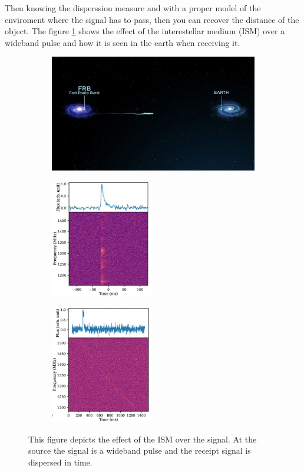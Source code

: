 Then knowing the disperssion measure and with a proper model of the enviroment where the signal has to pass, then you can recover the distance of the object. The figure \ref{fig:dm_example} shows the effect of the interestellar medium (ISM) over a wideband pulse and how it is seen in the earth when receiving it.

\begin{figure}
    \begin{subfigure}{\textwidth}
        \centering
        \includegraphics[width=\textwidth, height=0.3\textwidth]{images/frb_example.jpg}
    \end{subfigure}
    \begin{subfigure}{0.5\textwidth}
        \includegraphics[width=0.5\textwidth]{images/frb_ex_dedispersed.png}
    \end{subfigure}
    \hspace{2cm}
    \begin{subfigure}{0.5\textwidth}
        \centering
        \includegraphics[width=0.5\textwidth]{images/frb_ex_dispersed.png}
    \end{subfigure}
    \caption{This figure depicts the effect of the ISM over the signal. At the source the signal is a wideband pulse and the receipt signal is dispersed in time.}
    \label{fig:dm_example}
\end{figure}
